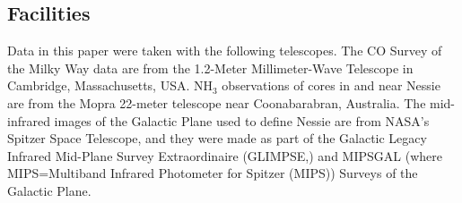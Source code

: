 \subsection {Facilities}
Data in this paper were taken with the following telescopes.  The CO Survey of the Milky Way data \cite{2001ApJ...547..792D} are from the 1.2-Meter Millimeter-Wave Telescope in Cambridge, Massachusetts, USA. NH$_3$ observations of cores \cite{2012MNRAS.426.1972P} in and near Nessie are from the Mopra 22-meter telescope near Coonabarabran, Australia. The mid-infrared images of the Galactic Plane used to define Nessie are from NASA's Spitzer Space Telescope, and they were made as part of the Galactic Legacy Infrared Mid-Plane Survey Extraordinaire (GLIMPSE\cite {2003PASP..115..953B},\cite{2009PASP..121..213C}) and MIPSGAL (where MIPS=Multiband Infrared Photometer for Spitzer (MIPS))\cite {http://adsabs.harvard.edu/cgi-bin/nph-data_query?bibcode=2009PASP..121...76C&db_key=AST&link_type=ABSTRACT} Surveys of the Galactic Plane.  